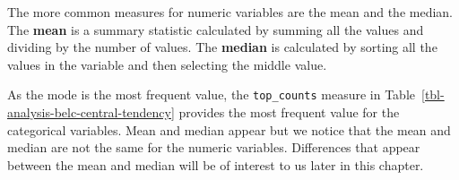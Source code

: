 \documentclass[
  letterpaper,
]{latex/krantz}
\theoremstyle{definition}
\theoremstyle{remark}
\begin{document}
The more common measures for numeric variables are the mean and the
median. The \textbf{mean} is a summary statistic calculated by summing
all the values and dividing by the number of values. The \textbf{median}
is calculated by sorting all the values in the variable and then
selecting the middle value.

\begin{table}

\caption{\label{tbl-analysis-belc-central-tendency}Central tendency
measures for the BELC dataset}

\begin{minipage}{0.50\linewidth}



\end{minipage}%
%
\begin{minipage}{0.50\linewidth}



\end{minipage}%

\end{table}%

As the mode is the most frequent value, the \texttt{top\_counts} measure
in Table~\ref{tbl-analysis-belc-central-tendency} provides the most
frequent value for the categorical variables. Mean and median appear but
we notice that the mean and median are not the same for the numeric
variables. Differences that appear between the mean and median will be
of interest to us later in this chapter.
\end{document}
